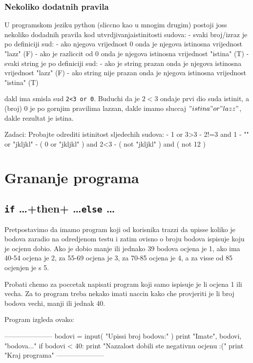 \subsection{Nekoliko dodatnih pravila}

U programskom jeziku python (sliccno kao u mnogim drugim) postoji
joss nekoliko dodadnih pravila kod utvrdjivanjaistinitosti sudova:
- svaki broj/izraz je po definiciji sud:
	- ako njegova vrijednost 0 onda je njegova istinosna vrijednost "lazz" (F)
	- ako je razliccit od 0 onda je njegova istinosna vrijednost "istina" (T)
- svaki string je po definiciji sud:
	- ako je string prazan onda je njegova istinosna vrijednost "lazz" (F)
	- ako string nije prazan onda je njegova istinosna vrijednost "istina" (T)

dakl ima smisla sud \verb"2<3 or 0". Buduchi da je $2<3$ ondaje prvi dio suda istinit, a (broj) 0 je
po gornjim pravilima lazzan, dakle imamo sluccaj $"istina" or "lazz"$, dakle rezultat je istina.

Zadaci: Probajte odrediti istinitost sljedechih sudova:
	- 1 or 3>3
	- 2!=3 and 1
	- "" or "jkljkl"
	- ( 0 or "jkljkl" ) and 2<3
	- ( not "jkljkl" ) and ( not 12 )

\chapter{Grananje programa}

\section{\verb+if+ \dots \ver+then+ \dots \verb+else+ \dots}

Pretpostavimo da imamo program koji od korisnika trazzi da upisse
koliko je bodova zaradio na odredjenom testu i zatim ovisno o broju
bodova ispisuje koju je ocjenu dobio. Ako je dobio manje ili jednako
39 bodova ocjena je 1, ako ima 40-54 ocjena je 2, za 55-69 ocjena
je 3, za 70-85 ocjena je 4, a za visse od 85 ocjenjen je s 5.

Probati chemo za poccetak napisati program koji samo ispisuje je
li ocjena 1 ili vecha. Za to program treba nekako imati naccin kako
che provjeriti je li broj bodova vechi, manji ili jednak 40.

Program izgleda ovako:

---------------------
bodovi = input( "Upissi broj bodova:" )
print "Imate", bodovi, "bodova..."
if bodovi < 40:
	print "Nazzalost dobili ste negativnu ocjenu :("
print "Kraj programa"
---------------------

